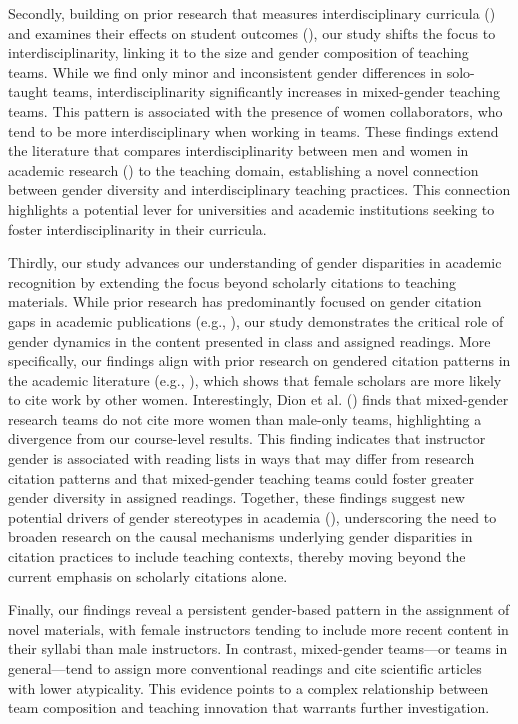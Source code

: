 \documentclass[
  british,
  11pt,
]{article}
\begin{document}
Secondly, building on prior research that measures interdisciplinary curricula () and examines their effects on student outcomes (), our study shifts the focus to interdisciplinarity, linking it to the size and gender composition of teaching teams. While we find only minor and inconsistent gender differences in solo-taught teams, interdisciplinarity significantly increases in mixed-gender teaching teams. This pattern is associated with the presence of women collaborators, who tend to be more interdisciplinary when working in teams. These findings extend the literature that compares interdisciplinarity between men and women in academic research () to the teaching domain, establishing a novel connection between gender diversity and interdisciplinary teaching practices. This connection highlights a potential lever for universities and academic institutions seeking to foster interdisciplinarity in their curricula.

Thirdly, our study advances our understanding of gender disparities in academic recognition by extending the focus beyond scholarly citations to teaching materials. While prior research has predominantly focused on gender citation gaps in academic publications (e.g., ), our study demonstrates the critical role of gender dynamics in the content presented in class and assigned readings. More specifically, our findings align with prior research on gendered citation patterns in the academic literature (e.g., ), which shows that female scholars are more likely to cite work by other women. Interestingly, Dion et al. () finds that mixed-gender research teams do not cite more women than male-only teams, highlighting a divergence from our course-level results. This finding indicates that instructor gender is associated with reading lists in ways that may differ from research citation patterns and that mixed-gender teaching teams could foster greater gender diversity in assigned readings. Together, these findings suggest new potential drivers of gender stereotypes in academia (), underscoring the need to broaden research on the causal mechanisms underlying gender disparities in citation practices to include teaching contexts, thereby moving beyond the current emphasis on scholarly citations alone.

Finally, our findings reveal a persistent gender-based pattern in the assignment of novel materials, with female instructors tending to include more recent content in their syllabi than male instructors. In contrast, mixed-gender teams---or teams in general---tend to assign more conventional readings and cite scientific articles with lower atypicality. This evidence points to a complex relationship between team composition and teaching innovation that warrants further investigation.
\end{document}
